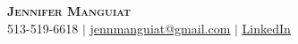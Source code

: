 \documentclass[letterpaper,11pt]{article}
\begin{document}

\begin{center}
    \textbf{\Huge \scshape Jennifer Manguiat} \\ \vspace{1pt}
    \small 513-519-6618 $|$ \href{mailto:jennmanguiat@gmail.com}{\underline{jennmanguiat@gmail.com}} $|$ \href{https://www.linkedin.com/in/jennifer-manguiat-42455613}{\underline{LinkedIn}} 
\end{center}

\end{document}

